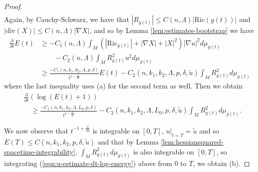 \documentclass[12pt]{amsart}
\newcommand{\del}{\nabla}
\theoremstyle{remark}
\numberwithin{equation}{section}
\begin{document}
\begin{proof}
\begin{align*}
    \end{align*}
    Again, by Cauchy-Schwarz, we have that $|R_{g(t)}|\leq C(n,\Lambda)|\text{Ric}(g(t))|$ and $|\text{div}(X)| \leq C(n,\Lambda)|\del X|$, and so by Lemma \ref{lem:estimates-bootstrap} we have
    \begin{align*}
        \frac{\partial}{\partial t} E(t) &\geq -C_1(n,\Lambda)\int_M \left(|\text{Ric}_{g(t)}| + |\del X| + |X|^2\right)|\del u|^2 d\mu_{g(t)} \nonumber \\
        &\qquad - C_2(n,\Lambda)\int_M R_{g(t)}^2u^2d\mu_{g(t)} \nonumber \\
        &\geq \frac{-C_1(n,k_1,k_2,\Lambda,p,\delta)}{t^{1-\frac{\delta}{2p}}}E(t) - C_2(n,k_1,k_2,\Lambda,p,\delta,\tilde{u})\int_MR_{g(t)}^2d\mu_{g(t)}
    \end{align*}
    where the last inequality uses (a) for the second term as well. Then we obtain
    \begin{align}\label{eqn:u-estimate-dt-log-energy}
        &\frac{\partial}{\partial t}\left(\log(E(t)+1)\right) \nonumber \\
        &\quad\geq \frac{-C_1(n,k_1,k_2,\Lambda,L_0,p,\delta)}{t^{1-\frac{\delta}{2p}}} - C_2(n,k_1,k_2,\Lambda,L_0,p,\delta,\tilde{u})\int_MR_{g(t)}^2d\mu_{g(t)}.
    \end{align}

    We now observe that $t^{-1+\frac{\delta}{2p}}$ is integrable on $[0,T]$, $u|_{t=T} = \tilde{u}$ and so $E(T) \leq C(n,k_1,k_2,p,\delta,\tilde{u})$ and that by Lemma \ref{lem:hessiansquared-spacetime-integrability}, $\int_M R_{g(t)}^2d\mu_{g(t)}$ is also integrable on $[0,T]$, so integrating (\ref{eqn:u-estimate-dt-log-energy}) above from $0$ to $T$, we obtain (b).


\end{proof}
\end{document}

